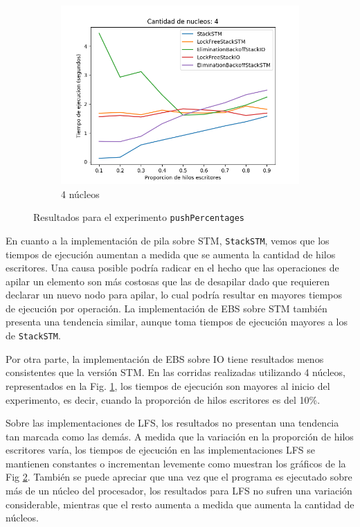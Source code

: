 \begin{figure}[!h]
\begin{subfigure}[b]{0.5\textwidth}
        \includegraphics[width=\textwidth]{images/pushPercentages/plots/4.png}
        \caption{4 núcleos}
        \label{subfig:pushPercentages-4core}
    \end{subfigure}
    \caption{Resultados para el experimento \texttt{pushPercentages}}
    \label{fig:pushPercentages-all}
\end{figure}

En cuanto a la implementación de pila sobre STM, \texttt{StackSTM}, vemos que los tiempos de ejecución aumentan a medida que se aumenta la cantidad de hilos escritores.
Una causa posible podría radicar en el hecho que las operaciones de apilar un elemento son más costosas que las de desapilar dado que requieren declarar un nuevo nodo para apilar, lo cual podría resultar en mayores tiempos de ejecución por operación.
La implementación de EBS sobre STM también presenta una tendencia similar, aunque toma tiempos de ejecución mayores a los de \texttt{StackSTM}.

Por otra parte, la implementación de EBS sobre IO tiene resultados menos consistentes que la versión STM.
En las corridas realizadas utilizando 4 núcleos, representados en la Fig. \ref{subfig:pushPercentages-4core}, los tiempos de ejecución son mayores al inicio del experimento, es decir, cuando la proporción de hilos escritores es del 10\%.

Sobre las implementaciones de LFS, los resultados no presentan una tendencia tan marcada como las demás. A medida que la variación en la proporción de hilos escritores varía, los tiempos de ejecución en las implementaciones LFS se mantienen constantes o incrementan levemente como muestran los gráficos de la Fig \ref{fig:pushPercentages-all}. También se puede apreciar que una vez que el programa es ejecutado sobre más de un núcleo del procesador, los resultados para LFS no sufren una variación considerable, mientras que el resto aumenta a medida que aumenta la cantidad de núcleos.

